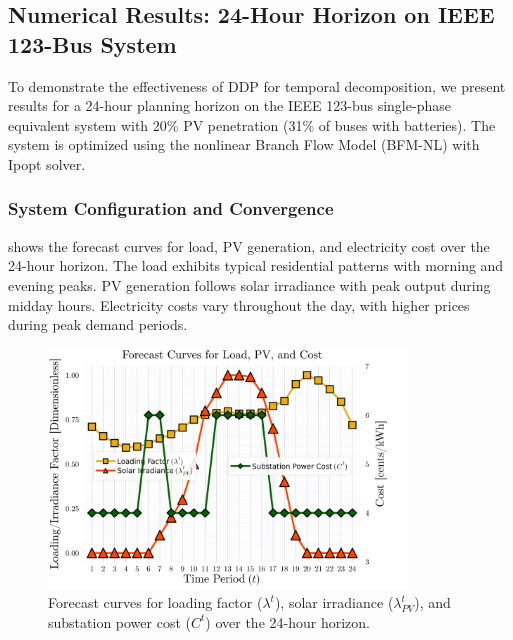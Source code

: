 \subsection{Numerical Results: 24-Hour Horizon on IEEE 123-Bus System}

To demonstrate the effectiveness of DDP for temporal decomposition, we present results for a 24-hour planning horizon on the IEEE 123-bus single-phase equivalent system with 20\% PV penetration (31\% of buses with batteries). The system is optimized using the nonlinear Branch Flow Model (BFM-NL) with Ipopt solver.

\subsubsection{System Configuration and Convergence}

 shows the forecast curves for load, PV generation, and electricity cost over the 24-hour horizon. The load exhibits typical residential patterns with morning and evening peaks. PV generation follows solar irradiance with peak output during midday hours. Electricity costs vary throughout the day, with higher prices during peak demand periods.

\begin{figure}[h]
    \centering
    \includegraphics[width=0.85\textwidth]{figures/Horizon_24_InputForecastCurves_bilevelCosts.png}
    \caption{Forecast curves for loading factor ($\lambda^t$), solar irradiance ($\lambda_{PV}^t$), and substation power cost ($C^t$) over the 24-hour horizon.}
    \label{fig:ddp-input-curves}
\end{figure}

